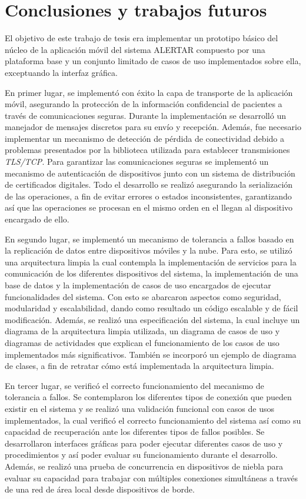 \chapter{Conclusiones y trabajos futuros}
\label{cap:conclusionesYTrabajosFuturos}

El objetivo de este trabajo de tesis era implementar un prototipo básico del núcleo de la aplicación móvil del sistema ALERTAR compuesto por una plataforma base y un conjunto limitado de casos de uso implementados sobre ella, exceptuando la interfaz gráfica. 

En primer lugar, se implementó con éxito la capa de transporte de la aplicación móvil, asegurando la protección de la información confidencial de pacientes a través de comunicaciones seguras. Durante la implementación se desarrolló un manejador de mensajes discretos para su envío y recepción. Además, fue necesario implementar un mecanismo de detección de pérdida de conectividad debido a problemas presentados por la biblioteca utilizada para establecer transmisiones \textit{TLS/TCP}. Para garantizar las comunicaciones seguras se implementó un mecanismo de autenticación de dispositivos junto con un sistema de distribución de certificados digitales. Todo el desarrollo se realizó asegurando la serialización de las operaciones, a fin de evitar errores o estados inconsistentes, garantizando así que las operaciones se procesan en el mismo orden en el llegan al dispositivo encargado de ello.

En segundo lugar, se implementó un mecanismo de tolerancia a fallos basado en la replicación de datos entre dispositivos móviles y la nube. Para esto, se utilizó una arquitectura limpia la cual contempla la implementación de servicios para la comunicación de los diferentes dispositivos del sistema, la implementación de una base de datos y la implementación de casos de uso encargados de ejecutar funcionalidades del sistema. Con esto se abarcaron aspectos como seguridad, modularidad y escalabilidad, dando como resultado un código escalable y de fácil modificación. Además, se realizó una especificación del sistema, la cual incluye un diagrama de la arquitectura limpia utilizada, un diagrama de casos de uso y diagramas de actividades que explican el funcionamiento de los casos de uso implementados más significativos. También se incorporó un ejemplo de diagrama de clases, a fin de retratar cómo está implementada la arquitectura limpia.

En tercer lugar, se verificó el correcto funcionamiento del mecanismo de tolerancia a fallos. Se contemplaron los diferentes tipos de conexión que pueden existir en el sistema y se realizó una validación funcional con casos de usos implementados, la cual verificó el correcto funcionamiento del sistema así como su capacidad de recuperación ante los diferentes tipos de fallos posibles. Se desarrollaron interfaces gráficas para poder ejecutar diferentes casos de uso y procedimientos y así poder evaluar su funcionamiento durante el desarrollo. Además, se realizó una prueba de concurrencia en dispositivos de niebla para evaluar su capacidad para trabajar con múltiples conexiones simultáneas a través de una red de área local desde dispositivos de borde.

